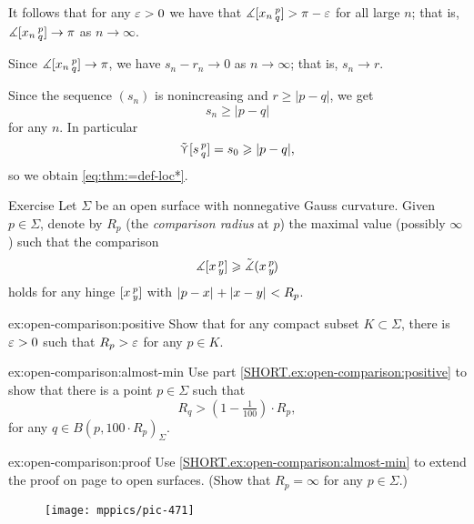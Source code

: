 It follows that for any $\varepsilon>0$ we have that $\measuredangle[x_n\,{}^{p}_{q}]> \pi-\varepsilon$ for all large $n$;
that is, $\measuredangle[x_n\,{}^{p}_{q}]\to \pi$ as $n\to\infty$.

Since $\measuredangle[x_n\,{}^{p}_{q}]\to \pi$, we have 
$s_n-r_n\to 0$ as $n\to\infty$;
that is, $s_n\to r$.

Since the sequence $(s_n)$ is nonincreasing and $r\ge |p-q|$, we get
\[s_n\ge |p-q|\]
for any $n$.
In particular
\[\tilde\curlyvee[s\,{}^{p}_{q}]=s_0\geqslant |p-q|,\] so we obtain \ref{eq:thm:=def-loc*}.
\qeds

\begin{thm}{Exercise}\label{ex:open-comparison}
Let $\Sigma$ be an open surface with nonnegative Gauss curvature.
Given $p\in\Sigma$, denote by $R_p$ 
(the \emph{comparison radius} at $p$) 
the maximal value (possibly $\infty$) such that the comparison 
\[\measuredangle[x\,{}^{p}_{y}]
\geqslant\tilde\measuredangle(x\,{}^{p}_{y}\hspace{-0.2ex})\]
holds for any hinge $[x\,{}^{p}_{y}]$ with $\dist{p}{x}{}+\dist{x}{y}{}<R_p$.

\begin{subthm}{ex:open-comparison:positive}
Show that for any compact subset $K\subset \Sigma$, there is $\varepsilon>0$ such that $R_p>\varepsilon$ for any $p\in K$.
\end{subthm}

\begin{subthm}{ex:open-comparison:almost-min}
Use part \ref{SHORT.ex:open-comparison:positive} to show that 
there is a point $p\in\Sigma$ such that 
\[R_q>(1-\tfrac1{100})\cdot R_p,\]
for any $q\in B(p,100\cdot R_p)_\Sigma$.
\end{subthm}

\begin{subthm}{ex:open-comparison:proof}
Use \ref{SHORT.ex:open-comparison:almost-min} to extend the proof on page \pageref{proof(thm:comp:toponogov)} to open surfaces. 
(Show that $R_p=\infty$ for any $p\in\Sigma$.) 
\end{subthm}


\end{thm}


\begin{wrapfigure}{r}{30 mm}
\vskip4mm
\centering
\texttt{[image: mppics/pic-471]}
\end{wrapfigure}

